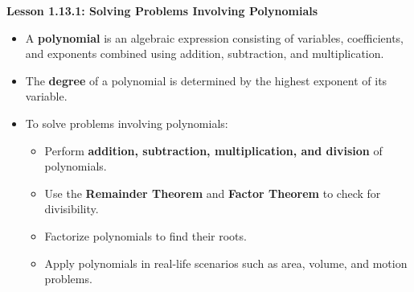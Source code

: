 \begin{center}
\textbf{Lesson 1.13.1: Solving Problems Involving Polynomials}
\end{center}

\vspace*{-1.5ex}

\begin{itemize}
    \item A \textbf{polynomial} is an algebraic expression consisting of variables, coefficients, and exponents combined using addition, subtraction, and multiplication.
    \item The \textbf{degree} of a polynomial is determined by the highest exponent of its variable.
    \item To solve problems involving polynomials:
    \begin{itemize}
        \item Perform \textbf{addition, subtraction, multiplication, and division} of polynomials.
        \item Use the \textbf{Remainder Theorem} and \textbf{Factor Theorem} to check for divisibility.
        \item Factorize polynomials to find their roots.
        \item Apply polynomials in real-life scenarios such as area, volume, and motion problems.
    \end{itemize}
\end{itemize}